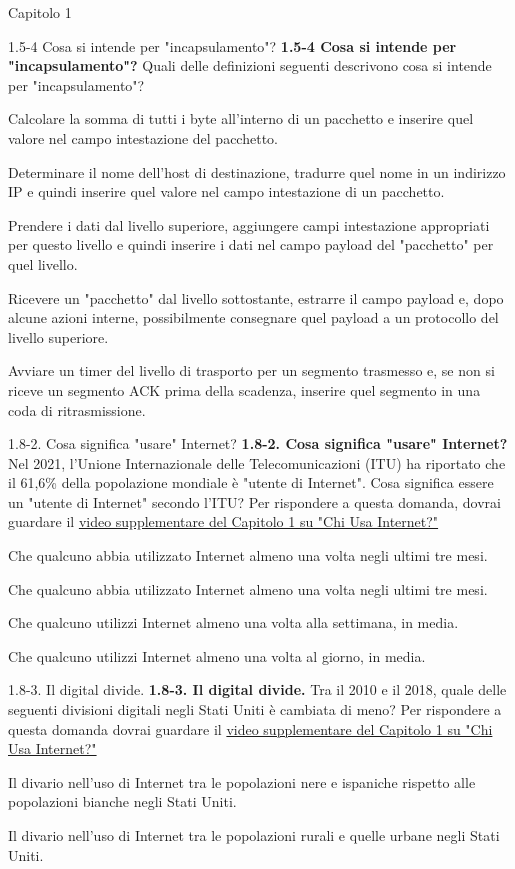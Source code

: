 \documentclass[a4paper]{article}
\begin{document}
\begin{quiz}{Capitolo 1}
\begin{multi}[points=1]{1.5-4 Cosa si intende per "incapsulamento"?}
\textbf{1.5-4 Cosa si intende per "incapsulamento"?} 
Quali delle definizioni seguenti descrivono cosa si intende per "incapsulamento"?
\item Calcolare la somma di tutti i byte all'interno di un pacchetto e inserire quel valore nel campo intestazione del pacchetto.
\item Determinare il nome dell'host di destinazione, tradurre quel nome in un indirizzo IP e quindi inserire quel valore nel campo intestazione di un pacchetto.
\item* Prendere i dati dal livello superiore, aggiungere campi intestazione appropriati per questo livello e quindi inserire i dati nel campo payload del "pacchetto" per quel livello.
\item Ricevere un "pacchetto" dal livello sottostante, estrarre il campo payload e, dopo alcune azioni interne, possibilmente consegnare quel payload a un protocollo del livello superiore.
\item Avviare un timer del livello di trasporto per un segmento trasmesso e, se non si riceve un segmento ACK prima della scadenza, inserire quel segmento in una coda di ritrasmissione.
\end{multi}

\begin{multi}[points=1]{1.8-2. Cosa significa "usare" Internet?}
\textbf{1.8-2. Cosa significa "usare" Internet?} 
Nel 2021, l'Unione Internazionale delle Telecomunicazioni (ITU) ha riportato che il 61,6\% della popolazione mondiale è "utente di Internet". Cosa significa essere un "utente di Internet" secondo l'ITU? 
Per rispondere a questa domanda, dovrai guardare il \href{https://www.youtube.com/watch?v=-YaGGf8C1A4}{video supplementare del Capitolo 1 su "Chi Usa Internet?"}
\item* Che qualcuno abbia utilizzato Internet almeno una volta negli ultimi tre mesi.
\item Che qualcuno abbia utilizzato Internet almeno una volta negli ultimi tre mesi.
\item Che qualcuno utilizzi Internet almeno una volta alla settimana, in media.
\item Che qualcuno utilizzi Internet almeno una volta al giorno, in media.
\end{multi}

\begin{multi}[points=1]{1.8-3. Il digital divide.}
\textbf{1.8-3. Il digital divide.} 
Tra il 2010 e il 2018, quale delle seguenti divisioni digitali negli Stati Uniti è cambiata di meno?
Per rispondere a questa domanda dovrai guardare il \href{https://www.youtube.com/watch?v=-YaGGf8C1A4}{video supplementare del Capitolo 1 su "Chi Usa Internet?"}
\item* Il divario nell'uso di Internet tra le popolazioni nere e ispaniche rispetto alle popolazioni bianche negli Stati Uniti.
\item Il divario nell'uso di Internet tra le popolazioni rurali e quelle urbane negli Stati Uniti.
\end{multi}


\end{quiz}
\end{document}
